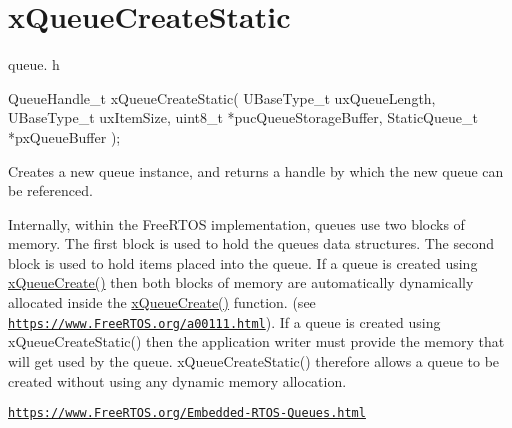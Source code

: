 \hypertarget{group__x_queue_create_static}{}\section{x\+Queue\+Create\+Static}
\label{group__x_queue_create_static}
queue. h 
\begin{DoxyPre}
  QueueHandle\_t xQueueCreateStatic(
                             UBaseType\_t uxQueueLength,
                             UBaseType\_t uxItemSize,
                             uint8\_t *pucQueueStorageBuffer,
                             StaticQueue\_t *pxQueueBuffer
                         );
  \end{DoxyPre}


Creates a new queue instance, and returns a handle by which the new queue can be referenced.

Internally, within the Free\+R\+T\+OS implementation, queues use two blocks of memory. The first block is used to hold the queue\textquotesingle{}s data structures. The second block is used to hold items placed into the queue. If a queue is created using \hyperlink{vendor_2ceedling_2plugins_2freertos_2src_2freertos_2include_2queue_8h_aeb858b824bd74a934ea7ebb81af2a6bb}{x\+Queue\+Create()} then both blocks of memory are automatically dynamically allocated inside the \hyperlink{vendor_2ceedling_2plugins_2freertos_2src_2freertos_2include_2queue_8h_aeb858b824bd74a934ea7ebb81af2a6bb}{x\+Queue\+Create()} function. (see \href{https://www.FreeRTOS.org/a00111.html}{\tt https\+://www.\+Free\+R\+T\+O\+S.\+org/a00111.\+html}). If a queue is created using x\+Queue\+Create\+Static() then the application writer must provide the memory that will get used by the queue. x\+Queue\+Create\+Static() therefore allows a queue to be created without using any dynamic memory allocation.

\href{https://www.FreeRTOS.org/Embedded-RTOS-Queues.html}{\tt https\+://www.\+Free\+R\+T\+O\+S.\+org/\+Embedded-\/\+R\+T\+O\+S-\/\+Queues.\+html}


